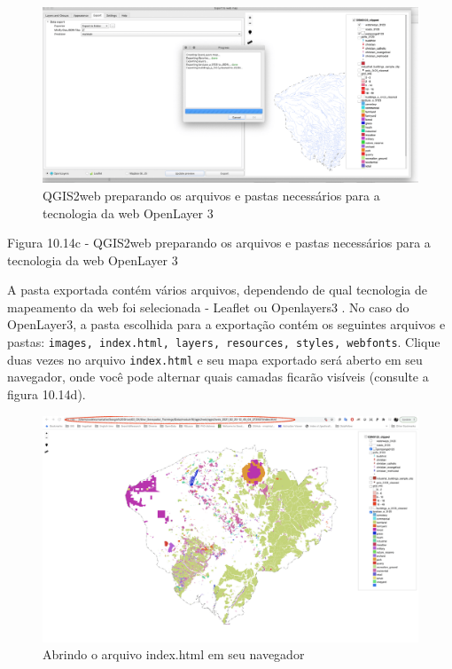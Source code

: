 \documentclass[
]{krantz}
\begin{document}
\begin{figure}
\centering
\includegraphics{media/modulo10/fig1014_c.png}
\caption{QGIS2web preparando os arquivos e pastas necessários para a tecnologia da web OpenLayer 3}
\end{figure}

Figura 10.14c - QGIS2web preparando os arquivos e pastas necessários para a tecnologia da web OpenLayer 3

A pasta exportada contém vários arquivos, dependendo de qual tecnologia de mapeamento da web foi selecionada - Leaflet ou Openlayers3 . No caso do OpenLayer3, a pasta escolhida para a exportação contém os seguintes arquivos e pastas: \texttt{images,\ index.html,\ layers,\ resources,\ styles,\ webfonts}. Clique duas vezes no arquivo \texttt{index.html} e seu mapa exportado será aberto em seu navegador, onde você pode alternar quais camadas ficarão visíveis (consulte a figura 10.14d).

\begin{figure}
\centering
\includegraphics{media/modulo10/fig1014_d.png}
\caption{Abrindo o arquivo index.html em seu navegador}
\end{figure}
\end{document}
